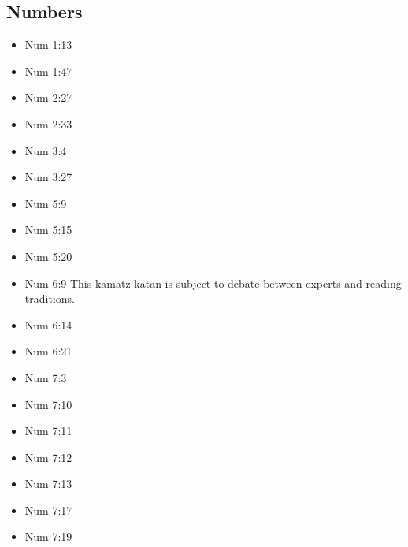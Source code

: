 \documentclass[14pt]{article}
\begin{document}
\subsection{Numbers}
\begin{multicols}{2}\begin{itemize}
\item Num 1:13

\item Num 1:47

\item Num 2:27

\item Num 2:33

\item Num 3:4

\item Num 3:27

\item Num 5:9

\item Num 5:15

\item Num 5:20

\item Num 6:9 This kamatz katan is subject to debate between experts and reading traditions.

\item Num 6:14

\item Num 6:21

\item Num 7:3

\item Num 7:10

\item Num 7:11

\item Num 7:12

\item Num 7:13

\item Num 7:17

\item Num 7:19


\end{itemize}
\end{multicols}
\end{document}
